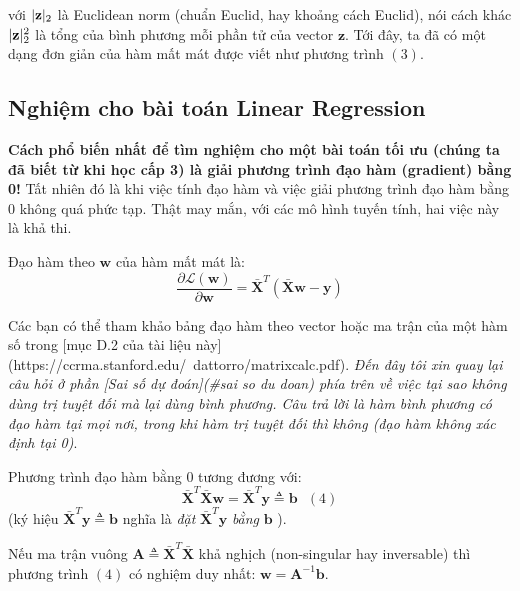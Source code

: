 với $ \\| \mathbf{z} \\|_2 $ là Euclidean norm (chuẩn Euclid, hay khoảng cách Euclid), nói cách khác $ \\| \mathbf{z} \\|_2^2 $ là tổng của bình phương mỗi phần tử của vector $\mathbf{z}$. Tới đây, ta đã có một dạng đơn giản của hàm mất mát được viết như phương trình $(3)$.





\subsection{Nghiệm cho bài toán Linear Regression}
\textbf{Cách phổ biến nhất để tìm nghiệm cho một bài toán tối ưu (chúng ta đã biết từ khi học cấp 3) là giải phương trình đạo hàm (gradient) bằng 0!} Tất nhiên đó là khi việc tính đạo hàm và việc giải phương trình đạo hàm bằng 0 không quá phức tạp. Thật may mắn, với các mô hình tuyến tính, hai việc này là khả thi. 

Đạo hàm theo $\mathbf{w} $ của hàm mất mát là: 
$$
\frac{\partial{\mathcal{L}(\mathbf{w})}}{\partial{\mathbf{w}}} 
= \mathbf{\bar{X}}^T(\mathbf{\bar{X}}\mathbf{w} - \mathbf{y}) 
$$

Các bạn có thể tham khảo bảng đạo hàm theo vector hoặc ma trận của một hàm số trong [mục D.2 của tài liệu này](https://ccrma.stanford.edu/~dattorro/matrixcalc.pdf). \textit{Đến đây tôi xin quay lại câu hỏi ở phần [Sai số dự đoán](#sai so du doan) phía trên về việc tại sao không dùng trị tuyệt đối mà lại dùng bình phương. Câu trả lời là hàm bình phương có đạo hàm tại mọi nơi, trong khi hàm trị tuyệt đối thì không (đạo hàm không xác định tại 0)}.

Phương trình đạo hàm bằng 0 tương đương với: 
$$
\mathbf{\bar{X}}^T\mathbf{\bar{X}}\mathbf{w} = \mathbf{\bar{X}}^T\mathbf{y} \triangleq \mathbf{b} 
~~~ (4)
$$
(ký hiệu $\mathbf{\bar{X}}^T\mathbf{y} \triangleq \mathbf{b} $ nghĩa là \textit{đặt} $\mathbf{\bar{X}}^T\mathbf{y}$ \textit{bằng} $\mathbf{b}$ ).

Nếu ma trận vuông $ \mathbf{A} \triangleq \mathbf{\bar{X}}^T\mathbf{\bar{X}}$ khả nghịch (non-singular hay inversable) thì phương trình $(4)$ có nghiệm duy nhất: $ \mathbf{w} = \mathbf{A}^{-1}\mathbf{b}  $.

